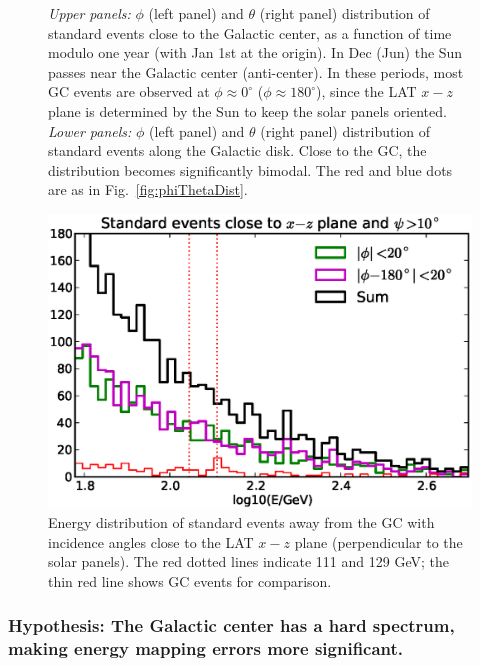 \documentclass[aps,twocolumn,prd,superscriptaddress,showpacs,nofootinbib,fixfloat]{revtex4}
\newcommand{\degree}{^{\rm o}}
\begin{document}
\begin{figure}
  \caption{\emph{Upper panels:} $\phi$ (left panel) and
  $\theta$ (right panel) distribution of standard events
  close to the Galactic center, as a function of time modulo
  one year (with Jan 1st at the origin). In Dec (Jun) the
  Sun passes near the Galactic center (anti-center).  In
  these periods, most GC events are observed at $\phi\approx
  0^\circ$ ($\phi\approx 180^\circ$), since the LAT $x-z$
  plane is determined by the Sun to keep the solar panels
  oriented. \emph{Lower panels:} $\phi$ (left panel) and
  $\theta$ (right panel) distribution of standard events
  along the Galactic disk. Close to the GC, the distribution
  becomes significantly bimodal. The red and blue dots are
  as in Fig.~\ref{fig:phiThetaDist}.}
  \label{fig:time_phi}
\end{figure}

\begin{figure}
  \centering
  \includegraphics[width=1.0\linewidth]{plots/phi_energy.eps}
  \caption{Energy distribution of standard events away from the GC with
  incidence angles close to the LAT $x-z$ plane (perpendicular to the solar
  panels). The red dotted lines indicate 111 and 129 GeV; the thin red line
  shows GC events for comparison.}
  \label{fig:spectrum_phi}
\end{figure}

\subsubsection{Hypothesis: The Galactic
center has a hard spectrum, making energy mapping errors more
significant.}
\end{document}
